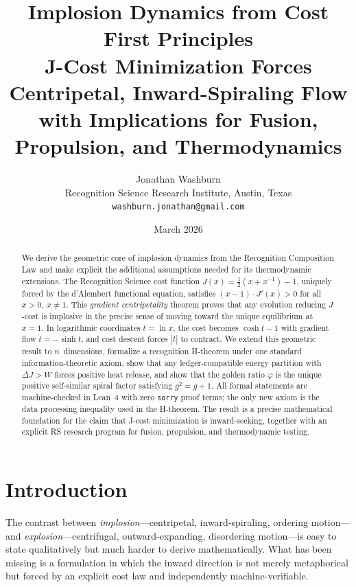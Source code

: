 \documentclass[11pt,a4paper]{article}
\title{\textbf{Implosion Dynamics from Cost First Principles}\\[0.4em]
\large J-Cost Minimization Forces Centripetal, Inward-Spiraling Flow\\
with Implications for Fusion, Propulsion, and Thermodynamics}
\author{Jonathan Washburn\\
\small Recognition Science Research Institute, Austin, Texas\\
\small \texttt{washburn.jonathan@gmail.com}}
\date{March 2026}
\theoremstyle{definition}
\newcommand{\phig}{\varphi}
\newcommand{\Jc}{J}
\begin{document}
\maketitle

\begin{abstract}
We derive the geometric core of implosion dynamics from the Recognition
Composition Law and make explicit the additional assumptions needed for its
thermodynamic extensions.  The Recognition Science cost function
$\Jc(x)=\tfrac{1}{2}(x+x^{-1})-1$, uniquely forced by the d'Alembert
functional equation, satisfies $(x-1)\cdot \Jc'(x)>0$ for all $x>0$,
$x\ne 1$.  This \emph{gradient centripetality} theorem proves that any
evolution reducing $\Jc$-cost is implosive in the precise sense of moving
toward the unique equilibrium at $x=1$.  In logarithmic coordinates
$t=\ln x$, the cost becomes $\cosh t - 1$ with gradient flow
$\dot t = -\sinh t$, and cost descent forces $|t|$ to contract.  We extend
this geometric result to $n$~dimensions, formalize a recognition H-theorem
under one standard information-theoretic axiom, show that any
ledger-compatible energy partition with $\Delta\Jc > W$ forces positive heat
release, and show that the golden ratio $\phig$ is the unique positive
self-similar spiral factor satisfying $g^2=g+1$.  All formal statements are
machine-checked in Lean~4 with zero \texttt{sorry} proof terms; the only new
axiom is the data processing inequality used in the H-theorem.  The result is
a precise mathematical foundation for the claim that J-cost minimization is
inward-seeking, together with an explicit RS research program for fusion,
propulsion, and thermodynamic testing.
\end{abstract}

\section{Introduction}
\label{sec:intro}

The contrast between \emph{implosion}---centripetal, inward-spiraling,
ordering motion---and \emph{explosion}---centrifugal, outward-expanding,
disordering motion---is easy to state qualitatively but much harder to derive
mathematically.  What has been missing is a formulation in which the inward
direction is not merely metaphorical but forced by an explicit cost law and
independently machine-verifiable.
\end{document}
